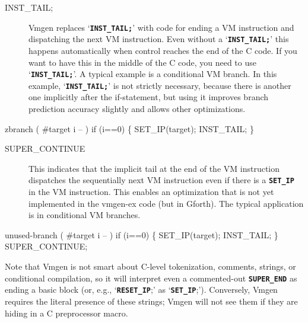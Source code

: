 \documentclass[10pt,english]{article}
\begin{document}
\begin{description}
\item [{INST\_TAIL;}] Vmgen replaces \textquoteleft{}\texttt{\textbf{INST\_TAIL;}}\textquoteright{}
with code for ending a VM instruction and dispatching the next VM
instruction. Even without a \textquoteleft{}\texttt{\textbf{INST\_TAIL;}}\textquoteright{}
this happens automatically when control reaches the end of the C code.
If you want to have this in the middle of the C code, you need to
use \textquoteleft{}\texttt{\textbf{INST\_TAIL;}}\textquoteright{}.
A typical example is a conditional VM branch. In this example, \textquoteleft{}\texttt{\textbf{INST\_TAIL;}}\textquoteright{}
is not strictly necessary, because there is another one implicitly
after the if-statement, but using it improves branch prediction accuracy
slightly and allows other optimizations.
\end{description}
\nwenddocs{}\endmoddef
zbranch ( #target i -- )
if (i==0) \{
  SET_IP(target);
  INST_TAIL;
\}
\nwendcode{}\nwdocspar

\begin{description}
\item [{SUPER\_CONTINUE}] This indicates that the implicit tail at the
end of the VM instruction dispatches the sequentially next VM instruction
even if there is a \texttt{\textbf{SET\_IP}} in the VM instruction.
This enables an optimization that is not yet implemented in the vmgen-ex
code (but in Gforth). The typical application is in conditional VM
branches.
\end{description}
\nwenddocs{}\endmoddef
unused-branch ( #target i -- )
if (i==0) \{
  SET_IP(target);
  INST_TAIL;
\}
SUPER_CONTINUE;
\nwendcode{}\nwdocspar

Note that Vmgen is not smart about C-level tokenization, comments,
strings, or conditional compilation, so it will interpret even a commented-out
\texttt{\textbf{SUPER\_END}} as ending a basic block (or, e.g., \textquoteleft{}\texttt{\textbf{RESET\_IP}};\textquoteright{}
as \textquoteleft{}\texttt{\textbf{SET\_IP}};\textquoteright{}). Conversely,
Vmgen requires the literal presence of these strings; Vmgen will not
see them if they are hiding in a C preprocessor macro.
\end{document}
